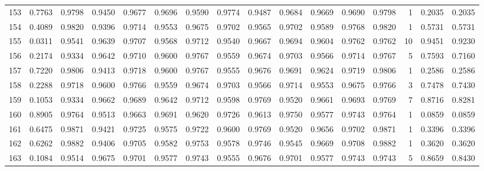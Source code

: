 \begin{tabular}{lrrrrrrrrrrrrrrr}
153 &      0.7763 &  0.9798 &  0.9450 &  0.9677 &  0.9696 &  0.9590 &  0.9774 &  0.9487 &  0.9684 &  0.9669 &   0.9690 &     0.9798 &      1 &                    0.2035 &                     0.2035 \\
154 &      0.4089 &  0.9820 &  0.9396 &  0.9714 &  0.9553 &  0.9675 &  0.9702 &  0.9565 &  0.9702 &  0.9589 &   0.9768 &     0.9820 &      1 &                    0.5731 &                     0.5731 \\
155 &      0.0311 &  0.9541 &  0.9639 &  0.9707 &  0.9568 &  0.9712 &  0.9540 &  0.9667 &  0.9694 &  0.9604 &   0.9762 &     0.9762 &     10 &                    0.9451 &                     0.9230 \\
156 &      0.2174 &  0.9334 &  0.9642 &  0.9710 &  0.9600 &  0.9767 &  0.9559 &  0.9674 &  0.9703 &  0.9566 &   0.9714 &     0.9767 &      5 &                    0.7593 &                     0.7160 \\
157 &      0.7220 &  0.9806 &  0.9413 &  0.9718 &  0.9600 &  0.9767 &  0.9555 &  0.9676 &  0.9691 &  0.9624 &   0.9719 &     0.9806 &      1 &                    0.2586 &                     0.2586 \\
158 &      0.2288 &  0.9718 &  0.9600 &  0.9766 &  0.9559 &  0.9674 &  0.9703 &  0.9566 &  0.9714 &  0.9553 &   0.9675 &     0.9766 &      3 &                    0.7478 &                     0.7430 \\
159 &      0.1053 &  0.9334 &  0.9662 &  0.9689 &  0.9642 &  0.9712 &  0.9598 &  0.9769 &  0.9520 &  0.9661 &   0.9693 &     0.9769 &      7 &                    0.8716 &                     0.8281 \\
160 &      0.8905 &  0.9764 &  0.9513 &  0.9663 &  0.9691 &  0.9620 &  0.9726 &  0.9613 &  0.9750 &  0.9577 &   0.9743 &     0.9764 &      1 &                    0.0859 &                     0.0859 \\
161 &      0.6475 &  0.9871 &  0.9421 &  0.9725 &  0.9575 &  0.9722 &  0.9600 &  0.9769 &  0.9520 &  0.9656 &   0.9702 &     0.9871 &      1 &                    0.3396 &                     0.3396 \\
162 &      0.6262 &  0.9882 &  0.9406 &  0.9705 &  0.9582 &  0.9753 &  0.9578 &  0.9746 &  0.9545 &  0.9669 &   0.9708 &     0.9882 &      1 &                    0.3620 &                     0.3620 \\
163 &      0.1084 &  0.9514 &  0.9675 &  0.9701 &  0.9577 &  0.9743 &  0.9555 &  0.9676 &  0.9701 &  0.9577 &   0.9743 &     0.9743 &      5 &                    0.8659 &                     0.8430 \\

\end{tabular}
